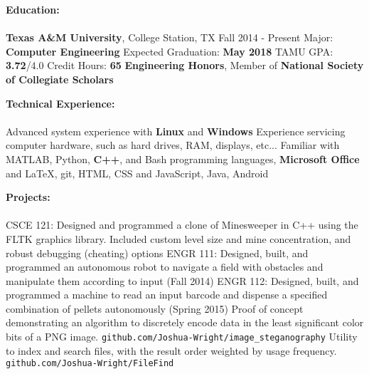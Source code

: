 \documentclass[12pt]{article}
\begin{document}
\begin{flushleft}
\begin{outline}[compactitem]

\newcommand{\upspace}{\vspace{0px}}
\newcommand{\zzz}[1]{\upspace \0 \textbf{#1} \\ \vspace{-0.8\baselineskip} \hrulefill \vspace{-2px} \\ }
\renewcommand\labelitemii{\labelitemi}
\let\oldOne\1\let\oldTwo\2\let\oldThree\3\let\oldFour\4
\renewcommand{\1}{\upspace \oldOne  }
\renewcommand{\2}{\upspace \oldTwo  }
\renewcommand{\3}{\upspace \oldThree}
\renewcommand{\4}{\upspace \oldFour }

\zzz{Education:}
  \1 \textbf{Texas A\&M University}, College Station, TX \hfill Fall 2014 - Present
    \2 Major: \textbf{Computer Engineering}
    \2 Expected Graduation: \textbf{May 2018}
    \2 TAMU GPA: \textbf{3.72}/4.0
    \2 Credit Hours: \textbf{65}
    \2 \textbf{Engineering Honors}, Member of \textbf{National Society of Collegiate Scholars}

\zzz{Technical Experience:}
  \1 Advanced system experience with \textbf{Linux} and \textbf{Windows}
  \1 Experience servicing computer hardware, such as hard drives, RAM, displays, etc...
  \1 Familiar with MATLAB, Python, \textbf{C++}, and Bash programming languages, 
  \textbf{Microsoft Office} and LaTeX, git, HTML, CSS and JavaScript, Java, Android

\zzz{Projects:}
  \1 CSCE 121: Designed and programmed a clone of Minesweeper in C++ using the FLTK graphics library. Included custom level size and mine concentration, and robust debugging (cheating) options
  \1 ENGR 111: Designed, built, and programmed an autonomous robot to navigate 
  a field with obstacles and manipulate them according to input (Fall 2014)
  \1 ENGR 112: Designed, built, and programmed a machine to read an input 
  barcode and dispense a specified combination of pellets autonomously (Spring 2015)
  \1 Proof of concept demonstrating an algorithm to discretely encode data in the least significant color bits of a PNG image.
    \verb|github.com/Joshua-Wright/image_steganography|
  \1 Utility to index and search files, with the result order weighted by usage frequency.
    \verb|github.com/Joshua-Wright/FileFind|


\end{outline}
\end{flushleft}
\end{document}
